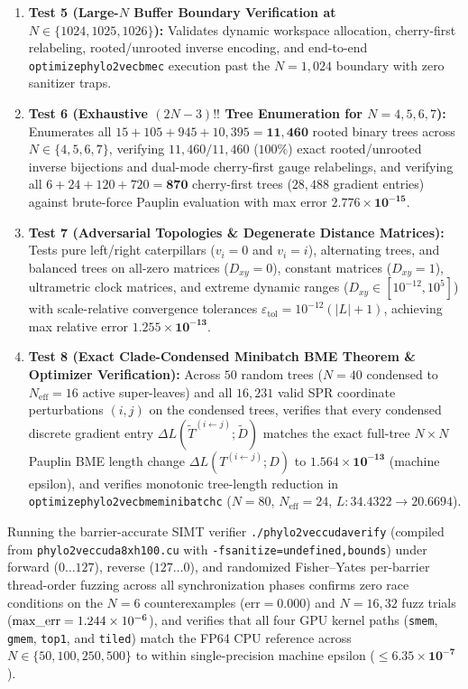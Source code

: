 \documentclass[11pt,a4paper]{article}
\makeatletter
\DeclareRobustCommand{\_}{\ifmmode\nfss@text{\textunderscore}\else\textunderscore\allowbreak\fi}
\theoremstyle{definition}
\makeatother
\begin{document}
\begin{enumerate}
    \item \textbf{Test 5 (Large-$N$ Buffer Boundary Verification at $N \in \{1024, 1025, 1026\}$):} Validates dynamic workspace allocation, cherry-first relabeling, rooted/unrooted inverse encoding, and end-to-end \texttt{optimize\_phylo2vec\_bme\_c} execution past the $N=1{,}024$ boundary with zero sanitizer traps.
    \item \textbf{Test 6 (Exhaustive $(2N-3)!!$ Tree Enumeration for $N = 4, 5, 6, 7$):} Enumerates all $15 + 105 + 945 + 10{,}395 = \mathbf{11{,}460}$ rooted binary trees across $N \in \{4, 5, 6, 7\}$, verifying $11{,}460 / 11{,}460$ ($100\%$) exact rooted/unrooted inverse bijections and dual-mode cherry-first gauge relabelings, and verifying all $6 + 24 + 120 + 720 = \mathbf{870}$ cherry-first trees ($28{,}488$ gradient entries) against brute-force Pauplin evaluation with max error $\mathbf{2.776 \times 10^{-15}}$.
    \item \textbf{Test 7 (Adversarial Topologies \& Degenerate Distance Matrices):} Tests pure left/right caterpillars ($v_i = 0$ and $v_i = i$), alternating trees, and balanced trees on all-zero matrices ($D_{xy} = 0$), constant matrices ($D_{xy} = 1$), ultrametric clock matrices, and extreme dynamic ranges ($D_{xy} \in [10^{-12}, 10^5]$) with scale-relative convergence tolerances $\varepsilon_{\text{tol}} = 10^{-12}(|L| + 1)$, achieving max relative error $\mathbf{1.255 \times 10^{-13}}$.
    \item \textbf{Test 8 (Exact Clade-Condensed Minibatch BME Theorem \& Optimizer Verification):} Across $50$ random trees ($N = 40$ condensed to $N_{\text{eff}} = 16$ active super-leaves) and all $16{,}231$ valid SPR coordinate perturbations $(i, j)$ on the condensed trees, verifies that every condensed discrete gradient entry $\Delta L(\widetilde{T}^{(i \leftarrow j)}; \widetilde{D})$ matches the exact full-tree $N \times N$ Pauplin BME length change $\Delta L(T^{(i \leftarrow j)}; D)$ to $\mathbf{1.564 \times 10^{-13}}$ (machine epsilon), and verifies monotonic tree-length reduction in \texttt{optimize\_phylo2vec\_bme\_minibatch\_c} ($N = 80$, $N_{\text{eff}} = 24$, $L: 34.4322 \to 20.6694$).
\end{enumerate}

Running the barrier-accurate SIMT verifier \texttt{./phylo2vec\_cuda\_verify} (compiled from \texttt{phylo2vec\_cuda\_8xh100.cu} with \texttt{-fsanitize=undefined,bounds}) under forward ($0 \dots 127$), reverse ($127 \dots 0$), and randomized Fisher--Yates per-barrier thread-order fuzzing across all synchronization phases confirms zero race conditions on the $N=6$ counterexamples ($\text{err} = 0.000$) and $N=16, 32$ fuzz trials ($\text{max\_err} = 1.244 \times 10^{-6}$), and verifies that all four GPU kernel paths (\texttt{smem}, \texttt{gmem}, \texttt{top1}, and \texttt{tiled}) match the FP64 CPU reference across $N \in \{50, 100, 250, 500\}$ to within single-precision machine epsilon ($\le \mathbf{6.35 \times 10^{-7}}$).
\end{document}
